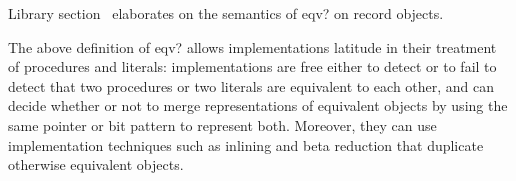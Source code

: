 \begin{entry}{%
}
\begin{note}
  Library section~ elaborates on the semantics of {\cf eqv?} on record
  objects.
\end{note}

\begin{rationale} 
The above definition of {\cf eqv?} allows implementations latitude in
their treatment of procedures and literals:  implementations are free
either to detect or to fail to detect that two procedures or two literals
are equivalent to each other, and can decide whether or not to
merge representations of equivalent objects by using the same pointer or
bit pattern to represent both.   Moreover, they can
use implementation techniques such as inlining and beta reduction that
duplicate otherwise equivalent objects.
\end{rationale}

\end{entry}



